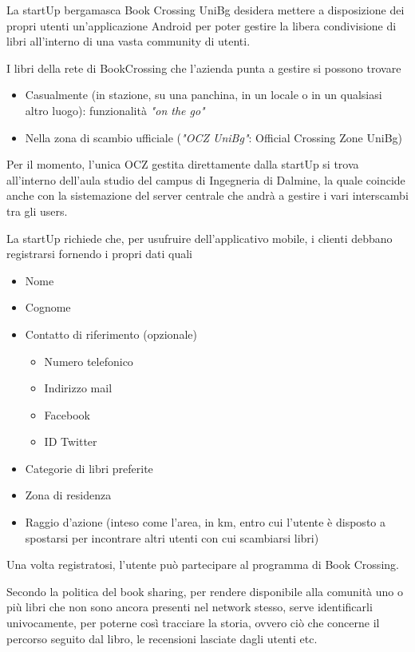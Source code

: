 La startUp bergamasca Book Crossing UniBg desidera mettere a disposizione dei propri
utenti un'applicazione Android per poter gestire la libera condivisione di libri all'interno di una vasta community di utenti.

I libri della rete di BookCrossing che l'azienda punta a gestire si possono trovare
\begin{itemize}
	\item Casualmente (in stazione, su una panchina, in un locale o in un qualsiasi altro luogo): funzionalità \textit{"on the go"}
	\item Nella zona di scambio ufficiale (\textit{"OCZ UniBg"}: Official Crossing Zone UniBg)
\end{itemize}

Per il momento, l'unica OCZ gestita direttamente dalla startUp si trova all'interno dell'aula studio del campus di Ingegneria di Dalmine, la quale coincide anche con la sistemazione del server centrale che andrà a gestire i vari interscambi tra gli users.

La startUp richiede che, per usufruire dell'applicativo mobile, i clienti debbano registrarsi fornendo i propri dati quali
\begin{itemize}
	\item Nome
	\item Cognome
	\item Contatto di riferimento (opzionale)
	\begin{itemize}
		\item Numero telefonico
		\item Indirizzo mail
		\item Facebook
		\item ID Twitter
	\end{itemize}
	\item Categorie di libri preferite
	\item Zona di residenza
	\item Raggio d'azione (inteso come l'area, in km, entro cui l'utente è disposto a spostarsi per incontrare altri utenti con cui scambiarsi libri)
\end{itemize}

Una volta registratosi, l'utente può partecipare al programma di Book Crossing.

Secondo la politica del book sharing, per rendere disponibile alla comunità 
uno o più libri che non sono ancora presenti nel network stesso, 
serve
identificarli univocamente, per poterne così tracciare la storia, ovvero ciò 
che concerne il percorso seguito dal libro, le recensioni lasciate dagli utenti etc.

